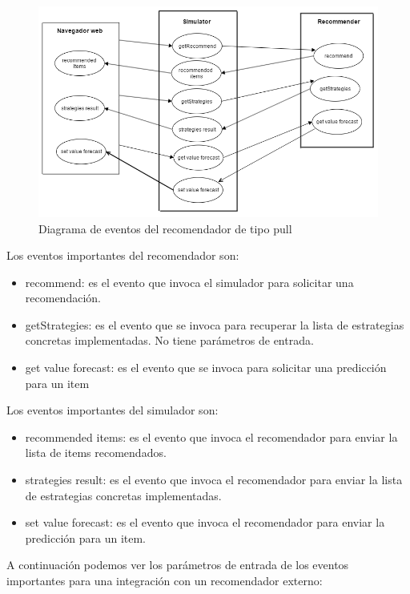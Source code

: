 \begin{figure}[H]
	\centering\includegraphics[scale=0.5]{imagenes/diagrama-de-eventos.png}
	\caption{Diagrama de eventos del recomendador de tipo pull}
	\label{img:diagramaEventosPull}
\end{figure}

Los eventos importantes del recomendador son:

\begin{itemize}
	\item recommend: es el evento que invoca el simulador para solicitar una recomendación.
	\item getStrategies: es el evento que se invoca para recuperar la lista de estrategias concretas implementadas. No tiene parámetros de entrada.
	\item get value forecast: es el evento que se invoca para solicitar una predicción para un item
\end{itemize}

Los eventos importantes del simulador son:
\begin{itemize}
	\item recommended items: es el evento que invoca el recomendador para enviar la lista de items recomendados.
	\item strategies result: es el evento que invoca el recomendador para enviar la lista de estrategias concretas implementadas.
	\item set value forecast: es el evento que invoca el recomendador para enviar la predicción para un item.
\end{itemize}

A continuación podemos ver los parámetros de entrada de los eventos importantes para una integración con un recomendador externo:

